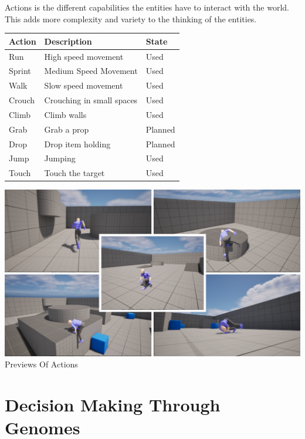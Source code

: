 \documentclass[10pt, letterpaper]{article}
\begin{document}
\begin{Form}
	Actions is the different capabilities the entities have to interact with the world. This adds more complexity
	and variety to the thinking of the entities.

	\begin{center}
		\begin{tabular}{|l|l|l|}
			\hline
			Action & Description               & State   \\
			\hline
			Run    & High speed movement       & Used    \\
			\hline
			Sprint & Medium Speed Movement     & Used    \\
			\hline
			Walk   & Slow speed movement       & Used    \\
			\hline
			Crouch & Crouching in small spaces & Used    \\
			\hline
			Climb  & Climb walls               & Used    \\
			\hline
			Grab   & Grab a prop               & Planned \\
			\hline
			Drop   & Drop item holding         & Planned \\
			\hline
			Jump   & Jumping                   & Used    \\
			\hline
			Touch  & Touch the target          & Used    \\
			\hline
		\end{tabular}
	\end{center}

	\begin{center}
		\includegraphics[scale=0.4]{IMG/ActionPreview.png} \\
		Previews Of Actions
	\end{center}

	\section{Decision Making Through Genomes}


\end{Form}
\end{document}
